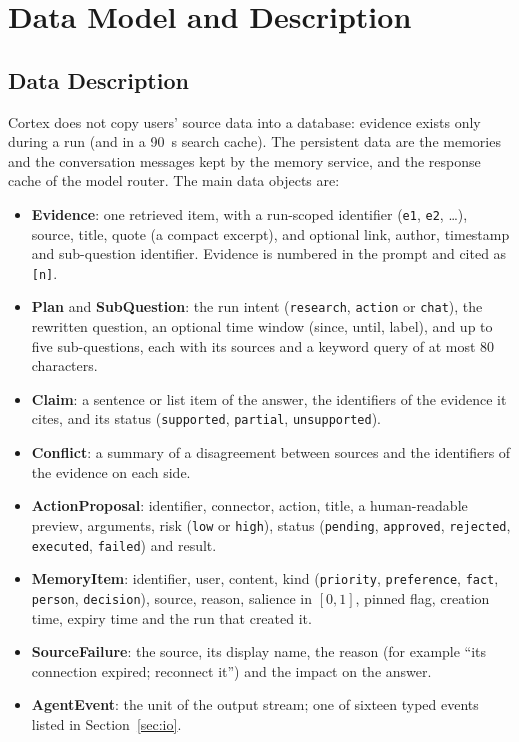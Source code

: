 \documentclass[oneside,a4paper,12pt]{report}
\begin{document}
\section{Data Model and Description}
\subsection{Data Description}
Cortex does not copy users' source data into a database: evidence exists only during a run (and in a 90~s search cache). The persistent data are the memories and the conversation messages kept by the memory service, and the response cache of the model router. The main data objects are:
\begin{itemize}
\item \textbf{Evidence}: one retrieved item, with a run-scoped identifier (\texttt{e1}, \texttt{e2}, \ldots), source, title, quote (a compact excerpt), and optional link, author, timestamp and sub-question identifier. Evidence is numbered in the prompt and cited as \texttt{[n]}.
\item \textbf{Plan} and \textbf{SubQuestion}: the run intent (\texttt{research}, \texttt{action} or \texttt{chat}), the rewritten question, an optional time window (since, until, label), and up to five sub-questions, each with its sources and a keyword query of at most 80 characters.
\item \textbf{Claim}: a sentence or list item of the answer, the identifiers of the evidence it cites, and its status (\texttt{supported}, \texttt{partial}, \texttt{unsupported}).
\item \textbf{Conflict}: a summary of a disagreement between sources and the identifiers of the evidence on each side.
\item \textbf{ActionProposal}: identifier, connector, action, title, a human-readable preview, arguments, risk (\texttt{low} or \texttt{high}), status (\texttt{pending}, \texttt{approved}, \texttt{rejected}, \texttt{executed}, \texttt{failed}) and result.
\item \textbf{MemoryItem}: identifier, user, content, kind (\texttt{priority}, \texttt{preference}, \texttt{fact}, \texttt{person}, \texttt{decision}), source, reason, salience in $[0,1]$, pinned flag, creation time, expiry time and the run that created it.
\item \textbf{SourceFailure}: the source, its display name, the reason (for example ``its connection expired; reconnect it'') and the impact on the answer.
\item \textbf{AgentEvent}: the unit of the output stream; one of sixteen typed events listed in Section~\ref{sec:io}.
\end{itemize}
\end{document}
